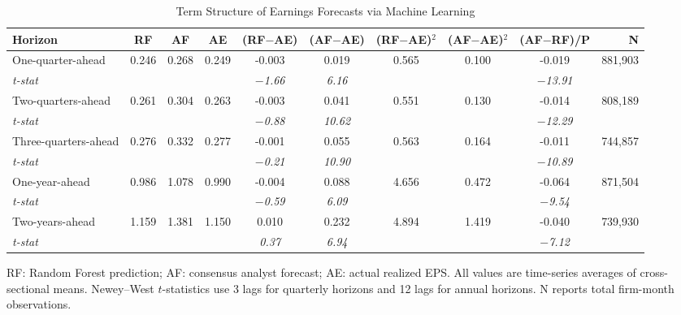 \documentclass[12pt]{article}
\begin{document}
\begin{table}[H]
\centering
\caption{Term Structure of Earnings Forecasts via Machine Learning}
\label{tab:term_structure}
\begin{threeparttable}
\small
\begin{tabular}{l S[table-format=1.3] S[table-format=1.3] S[table-format=1.3]
                  S[table-format=-1.3] S[table-format=-1.3]
                  S[table-format=1.3] S[table-format=1.3]
                  S[table-format=-1.3]
                  r}
\toprule
Horizon & {RF} & {AF} & {AE} & {(RF$-$AE)} & {(AF$-$AE)}
        & {(RF$-$AE)$^2$} & {(AF$-$AE)$^2$} & {(AF$-$RF)/P} & {N} \\
\midrule
One-quarter-ahead   & 0.246 & 0.268 & 0.249 & -0.003 & 0.019 & 0.565 & 0.100 & -0.019 & 881,903 \\
\textit{t-stat}     &       &       &       & {\textit{$-$1.66}} & {\textit{6.16}}  & & & {\textit{$-$13.91}} & \\
\addlinespace
Two-quarters-ahead  & 0.261 & 0.304 & 0.263 & -0.003 & 0.041 & 0.551 & 0.130 & -0.014 & 808,189 \\
\textit{t-stat}     &       &       &       & {\textit{$-$0.88}} & {\textit{10.62}} & & & {\textit{$-$12.29}} & \\
\addlinespace
Three-quarters-ahead& 0.276 & 0.332 & 0.277 & -0.001 & 0.055 & 0.563 & 0.164 & -0.011 & 744,857 \\
\textit{t-stat}     &       &       &       & {\textit{$-$0.21}} & {\textit{10.90}} & & & {\textit{$-$10.89}} & \\
\addlinespace
One-year-ahead      & 0.986 & 1.078 & 0.990 & -0.004 & 0.088 & 4.656 & 0.472 & -0.064 & 871,504 \\
\textit{t-stat}     &       &       &       & {\textit{$-$0.59}} & {\textit{6.09}}  & & & {\textit{$-$9.54}}  & \\
\addlinespace
Two-years-ahead     & 1.159 & 1.381 & 1.150 &  0.010  & 0.232 & 4.894 & 1.419 & -0.040 & 739,930 \\
\textit{t-stat}     &       &       &       & {\textit{0.37}}    & {\textit{6.94}}  & & & {\textit{$-$7.12}}  & \\
\bottomrule
\end{tabular}
\begin{tablenotes}
  \footnotesize
  \item RF: Random Forest prediction; AF: consensus analyst forecast; AE:
  actual realized EPS. All values are time-series averages of cross-sectional
  means. Newey--West $t$-statistics use 3 lags for quarterly horizons and
  12 lags for annual horizons. N reports total firm-month observations.
\end{tablenotes}
\end{threeparttable}
\end{table}
\end{document}
